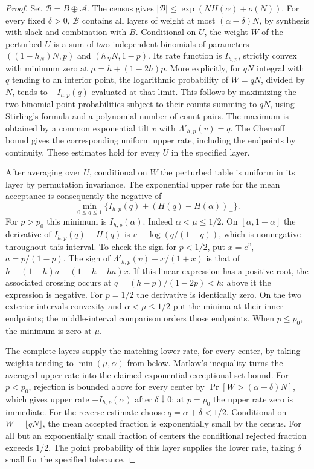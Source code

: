 \begin{proof}
Set \(\mathcal B=B\oplus\mathcal A\). The census gives \(|\mathcal B|\le\exp(NH(\alpha)+o(N))\). For every fixed \(\delta>0\), \(\mathcal B\) contains all layers of weight at most \((\alpha-\delta)N\), by synthesis with slack and combination with \(B\). Conditional on \(U\), the weight \(W\) of the perturbed \(U\) is a sum of two independent binomials of parameters \(((1-h_N)N,p)\) and \((h_NN,1-p)\). Its rate function is \(I_{h,p}\), strictly convex with minimum zero at \(\mu=h+(1-2h)p\). More explicitly, for \(qN\) integral with \(q\) tending to an interior point, the logarithmic probability of \(W=qN\), divided by \(N\), tends to \(-I_{h,p}(q)\) evaluated at that limit. This follows by maximizing the two binomial point probabilities subject to their counts summing to \(qN\), using Stirling's formula and a polynomial number of count pairs. The maximum is obtained by a common exponential tilt \(v\) with \(\Lambda'_{h,p}(v)=q\). The Chernoff bound gives the corresponding uniform upper rate, including the endpoints by continuity. These estimates hold for every \(U\) in the specified layer.

After averaging over \(U\), conditional on \(W\) the perturbed table is uniform in its layer by permutation invariance. The exponential upper rate for the mean acceptance is consequently the negative of
\[
 \min_{0\le q\le1}\{I_{h,p}(q)+(H(q)-H(\alpha))_+\}.
\]
For \(p>p_0\) this minimum is \(I_{h,p}(\alpha)\). Indeed \(\alpha<\mu\le1/2\). On \([\alpha,1-\alpha]\) the derivative of \(I_{h,p}(q)+H(q)\) is \(v-\log(q/(1-q))\), which is nonnegative throughout this interval. To check the sign for \(p<1/2\), put \(x=e^v\), \(a=p/(1-p)\). The sign of \(\Lambda'_{h,p}(v)-x/(1+x)\) is that of \(h-(1-h)a-(1-h-ha)x\). If this linear expression has a positive root, the associated crossing occurs at \(q=(h-p)/(1-2p)<h\); above it the expression is negative. For \(p=1/2\) the derivative is identically zero. On the two exterior intervals convexity and \(\alpha<\mu\le1/2\) put the minima at their inner endpoints; the middle-interval comparison orders those endpoints. When \(p\le p_0\), the minimum is zero at \(\mu\).

The complete layers supply the matching lower rate, for every center, by taking weights tending to \(\min(\mu,\alpha)\) from below. Markov's inequality turns the averaged upper rate into the claimed exponential exceptional-set bound. For \(p<p_0\), rejection is bounded above for every center by \(\Pr[W>(\alpha-\delta)N]\), which gives upper rate \(-I_{h,p}(\alpha)\) after \(\delta\downarrow0\); at \(p=p_0\) the upper rate zero is immediate. For the reverse estimate choose \(q=\alpha+\delta<1/2\). Conditional on \(W=\lfloor qN\rfloor\), the mean accepted fraction is exponentially small by the census. For all but an exponentially small fraction of centers the conditional rejected fraction exceeds \(1/2\). The point probability of this layer supplies the lower rate, taking \(\delta\) small for the specified tolerance.


\end{proof}
